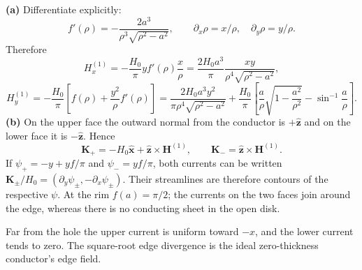\textbf{(a)} Differentiate explicitly:
\[
f'(\rho)=-\frac{2a^3}{\rho^3\sqrt{\rho^2-a^2}},\qquad
\partial_x\rho=x/\rho,\quad\partial_y\rho=y/\rho.
\]
Therefore
\[
\boxed{H_x^{(1)}=-\frac{H_0}{\pi}y f'(\rho)\frac x\rho
=\frac{2H_0a^3}{\pi}\frac{xy}{\rho^4\sqrt{\rho^2-a^2}},}
\]
\[
\boxed{H_y^{(1)}=-\frac{H_0}{\pi}
\left[f(\rho)+\frac{y^2}{\rho}f'(\rho)\right]
=\frac{2H_0a^3y^2}{\pi\rho^4\sqrt{\rho^2-a^2}}
+\frac{H_0}{\pi}
\left[\frac a\rho\sqrt{1-\frac{a^2}{\rho^2}}-\sin^{-1}\frac a\rho\right].}
\]
\textbf{(b)} On the upper face the outward normal from the conductor
is $+\widehat{\mathbf z}$ and on the lower face it is
$-\widehat{\mathbf z}$. Hence
\[
\mathbf K_+=-\!H_0\widehat{\mathbf x}
+\widehat{\mathbf z}\times\mathbf H^{(1)},\qquad
\mathbf K_-=\widehat{\mathbf z}\times\mathbf H^{(1)}.
\]
If $\psi_+=-y+yf/\pi$ and $\psi_-=yf/\pi$, both currents can be written
$\mathbf K_\pm/H_0=(\partial_y\psi_\pm,-\partial_x\psi_\pm)$.
Their streamlines are therefore contours of the respective $\psi$.
At the rim $f(a)=\pi/2$; the currents on the two faces join around
the edge, whereas there is no conducting sheet in the open disk.
\begin{center}

\end{center}
Far from the hole the upper current is uniform toward $-x$, and
the lower current tends to zero. The square-root edge divergence is
the ideal zero-thickness conductor's edge field.


